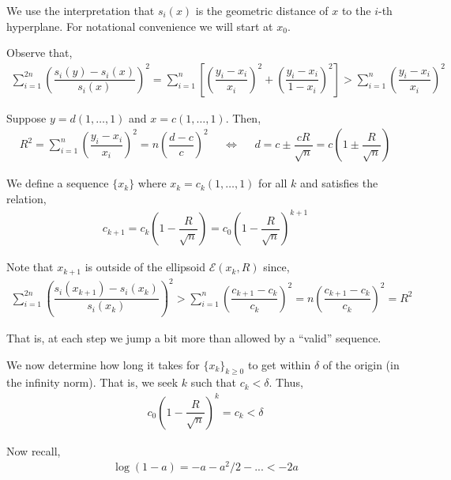 \documentclass[10pt]{article}
\begin{document}
\begin{solution}



We use the interpretation that \( s_i(x) \) is the geometric distance of \( x \) to the \( i \)-th hyperplane. For notational convenience we will start at \( x_0 \).

Observe that,
\begin{align*}
    \sum_{i=1}^{2n} \left( \dfrac{s_i(y)-s_i(x)}{s_i(x)} \right)^2 
    = \sum_{i=1}^{n} \left[ \left( \dfrac{y_i-x_i}{x_i} \right)^2 + \left( \dfrac{y_i-x_i}{1-x_i} \right)^2 \right] > \sum_{i=1}^{n} \left( \dfrac{y_i-x_i}{x_i} \right)^2
\end{align*}

Suppose \( y = d(1,\ldots, 1) \) and \( x = c(1,\ldots, 1) \). Then,
\begin{align*}
    R^2 = \sum_{i=1}^{n} \left( \dfrac{y_i-x_i}{x_i} \right)^2 = n \left( \dfrac{d-c}{c} \right)^2
    && \Longleftrightarrow &&
    d = c \pm \dfrac{c R}{\sqrt{n}} = c \left(1 \pm \dfrac{R}{\sqrt{n}}\right)
\end{align*}

We define a sequence \( \{x_k\} \) where \( x_k = c_k(1, \ldots, 1) \) for all \( k \) and satisfies the relation,
\begin{align*}
    c_{k+1} = c_k \left( 1 - \dfrac{R}{\sqrt{n}}  \right) = c_0 \left( 1- \dfrac{R}{\sqrt{n}} \right)^{k+1} 
\end{align*}

Note that \( x_{k+1} \) is outside of the ellipsoid \( \mathcal{E} (x_k,R) \) since,
\begin{align*}
    \sum_{i=1}^{2n} \left( \dfrac{s_i(x_{k+1})-s_i(x_k)}{s_i(x_k)} \right)^2 
    > \sum_{i=1}^{n} \left( \dfrac{c_{k+1}-c_k}{c_k} \right)^2 
    = n\left( \dfrac{c_{k+1}-c_k}{c_k} \right)^2 = R^2
\end{align*}

That is, at each step we jump a bit more than allowed by a ``valid'' sequence.

We now determine how long it takes for \( \{x_k\}_{k\geq 0} \) to get within \( \delta \) of the origin (in the infinity norm). That is, we seek \( k \) such that \( c_k < \delta \). Thus,
\begin{align*}
    c_0 \left( 1-\dfrac{R}{\sqrt{n}} \right)^{k} = c_k < \delta
\end{align*}

Now recall,
\begin{align*}
    \log \left( 1-a \right) = -a-a^2/2 - ... < -2a
\end{align*}



\end{solution}
\end{document}
